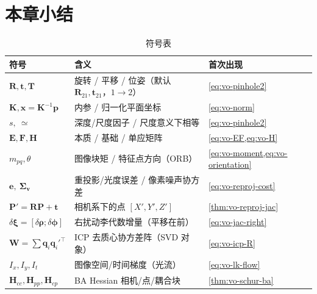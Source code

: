 \section*{本章小结}

\begin{table}[H]\centering\small
\caption{符号表}
\begin{tabular}{lll}
\toprule
符号 & 含义 & 首次出现 \\
\midrule
$\mathbf{R},\mathbf{t},\mathbf{T}$ & 旋转 / 平移 / 位姿（默认 $\mathbf{R}_{21},\mathbf{t}_{21}$，$1\!\to\!2$） & \cref{eq:vo-pinhole2} \\
$\mathbf{K},\mathbf{x}=\mathbf{K}^{-1}\mathbf{p}$ & 内参 / 归一化平面坐标 & \cref{eq:vo-norm} \\
$s,\ \simeq$ & 深度/尺度因子 / 尺度意义下相等 & \cref{eq:vo-pinhole2} \\
$\mathbf{E},\mathbf{F},\mathbf{H}$ & 本质 / 基础 / 单应矩阵 & \cref{eq:vo-EF,eq:vo-H} \\
$m_{pq},\theta$ & 图像块矩 / 特征点方向（ORB） & \cref{eq:vo-moment,eq:vo-orientation} \\
$\mathbf{e},\ \boldsymbol{\Sigma}_{\mathbf v}$ & 重投影/光度误差 / 像素噪声协方差 & \cref{eq:vo-reproj-cost} \\
$\mathbf{P}'=\mathbf{R}\mathbf{P}+\mathbf{t}$ & 相机系下的点 $[X',Y',Z']$ & \cref{thm:vo-reproj-jac} \\
$\delta\boldsymbol{\xi}=[\delta\boldsymbol{\rho};\delta\boldsymbol{\phi}]$ & 右扰动李代数增量（平移在前） & \cref{eq:vo-jac-right} \\
$\mathbf{W}=\sum\mathbf{q}_i\mathbf{q}_i'^\top$ & ICP 去质心协方差阵（SVD 对象） & \cref{eq:vo-icp-R} \\
$I_x,I_y,I_t$ & 图像空间/时间梯度（光流） & \cref{eq:vo-lk-flow} \\
$\mathbf{H}_{cc},\mathbf{H}_{pp},\mathbf{H}_{cp}$ & BA Hessian 相机/点/耦合块 & \cref{thm:vo-schur-ba} \\
\bottomrule
\end{tabular}
\end{table}

